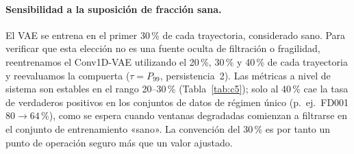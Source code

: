 \documentclass[5p,times,authoryear]{elsarticle}
\begin{document}
\begin{table}[!t]
\centering
\caption{RMSE en zona crítica del Transformer evaluado sobre todas las ventanas críticas frente a solo las ventanas críticas posteriores al disparo del sistema (mejor configuración por conjunto de datos). La cobertura es la fracción de ventanas críticas capturadas tras el disparo. Ambas columnas usan el modelo desplegado único sobre la trayectoria de prueba completa; la pequeña diferencia con el RMSE@crítico de la Tabla~\ref{tab:rul} refleja que este último es la media sobre las diez semillas.}
\label{tab:m8}
\small
{}
\end{table}

\paragraph{Sensibilidad a la suposición de fracción sana.} El VAE se entrena en el primer 30\,\% de cada trayectoria, considerado sano. Para verificar que esta elección no es una fuente oculta de filtración o fragilidad, reentrenamos el Conv1D-VAE utilizando el 20\,\%, 30\,\% y 40\,\% de cada trayectoria y reevaluamos la compuerta ($\tau{=}P_{99}$, persistencia~2). Las métricas a nivel de sistema son estables en el rango 20--30\,\% (Tabla~\ref{tab:c5}); solo al 40\,\% cae la tasa de verdaderos positivos en los conjuntos de datos de régimen único (p.~ej.\ FD001 $80\rightarrow64\,\%$), como se espera cuando ventanas degradadas comienzan a filtrarse en el conjunto de entrenamiento «sano». La convención del 30\,\% es por tanto un punto de operación seguro más que un valor ajustado.
\end{document}
